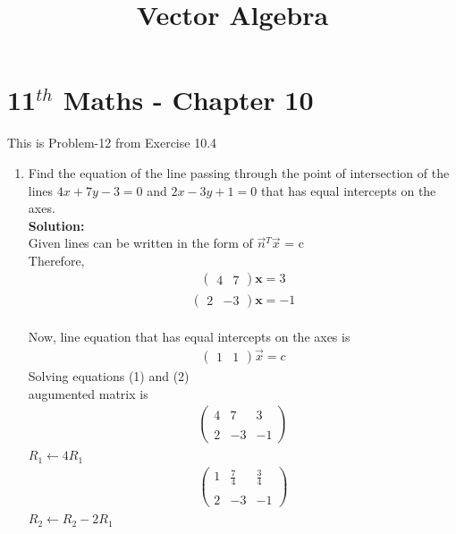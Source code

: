 \documentclass[12pt]{article}
\newcommand{\solution}{\noindent \textbf{Solution: }}
\newcommand{\myvec}[1]{\ensuremath{\begin{pmatrix}#1\end{pmatrix}}}
\let\vec\mathbf
\begin{document}
\begin{center}
\title{\textbf{Vector Algebra}}
\date{\vspace{-5ex}} %
\maketitle
\end{center}
\setcounter{page}{1}
\section*{11$^{th}$ Maths - Chapter 10}
This is Problem-12 from Exercise 10.4
\begin{enumerate}
    \item Find the equation of the line passing through the point of intersection of the lines $4x + 7y - 3 = 0$ and $2x - 3y + 1 = 0$ that has equal intercepts on the axes.\\
    \solution \\
    Given lines can be written in the form of $\Vec{n}$$^{T}$$\Vec{x}$ = c
   \\Therefore,\\ \begin{align}
       \myvec{4&7}\vec{x}=3
   \end{align} 
   \begin{align}
       \myvec{2&-3}\vec{x}=-1
   \end{align}\\
   Now, line equation that has equal intercepts on the axes is
   \begin{align}
       \myvec{1 & 1}\Vec{x}=c
   \end{align}
   Solving equations (1) and (2)\\augumented matrix is
  \begin{align}
\begin{pmatrix}
    4 & 7 & 3 \\ \\
    2 & -3 & -1
  \end{pmatrix}
\end{align}
$R_1 \leftarrow 4 R_1$
\begin{align}
\begin{pmatrix}
    1 & \frac{7}{4} & \frac{3}{4} \\ \\
    2 & -3 & -1
  \end{pmatrix}
\end{align}
$R_2 \leftarrow R_2 - 2R_1$
\begin{align}

\end{align}
\end{enumerate}
\end{document}
